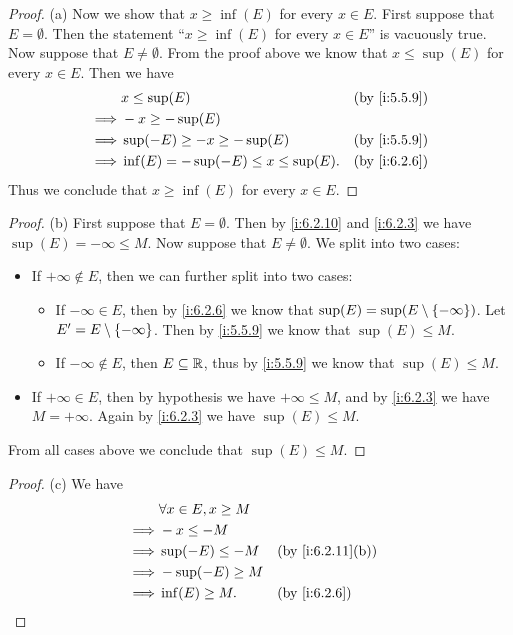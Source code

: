 \begin{proof}{(a)}
  Now we show that \(x \geq \inf(E)\) for every \(x \in E\).
  First suppose that \(E = \emptyset\).
  Then the statement ``\(x \geq \inf(E)\) for every \(x \in E\)'' is vacuously true.
  Now suppose that \(E \neq \emptyset\).
  From the proof above we know that \(x \leq \sup(E)\) for every \(x \in E\).
  Then we have
  \begin{align*}
             & x \leq \sup(E)                           &  & \by{i:5.5.9} \\
    \implies & -x \geq -\sup(E)                                           \\
    \implies & \sup(-E) \geq -x \geq -\sup(E)           &  & \by{i:5.5.9} \\
    \implies & \inf(E) = -\sup(-E) \leq x \leq \sup(E). &  & \by{i:6.2.6}
  \end{align*}
  Thus we conclude that \(x \geq \inf(E)\) for every \(x \in E\).
\end{proof}

\begin{proof}{(b)}
  First suppose that \(E = \emptyset\).
  Then by \cref{i:6.2.10} and \cref{i:6.2.3} we have \(\sup(E) = -\infty \leq M\).
  Now suppose that \(E \neq \emptyset\).
  We split into two cases:
  \begin{itemize}
    \item If \(+\infty \not\in E\), then we can further split into two cases:
          \begin{itemize}
            \item If \(-\infty \in E\), then by \cref{i:6.2.6} we know that \(\sup(E) = \sup(E \setminus \left\lbrace-\infty\right\rbrace)\).
                  Let \(E' = E \setminus \left\lbrace-\infty\right\rbrace\).
                  Then by \cref{i:5.5.9} we know that \(\sup(E) \leq M\).
            \item If \(-\infty \notin E\), then \(E \subseteq \mathbb{R}\), thus by \cref{i:5.5.9} we know that \(\sup(E) \leq M\).
          \end{itemize}
    \item If \(+\infty \in E\), then by hypothesis we have \(+\infty \leq M\), and by \cref{i:6.2.3} we have \(M = +\infty\).
          Again by \cref{i:6.2.3} we have \(\sup(E) \leq M\).
  \end{itemize}
  From all cases above we conclude that \(\sup(E) \leq M\).
\end{proof}

\begin{proof}{(c)}
  We have
  \begin{align*}
             & \forall x \in E, x \geq M                       \\
    \implies & -x \leq -M                                      \\
    \implies & \sup(-E) \leq -M          &  & \by{i:6.2.11}[b] \\
    \implies & -\sup(-E) \geq M                                \\
    \implies & \inf(E) \geq M.           &  & \by{i:6.2.6}
  \end{align*}
\end{proof}

